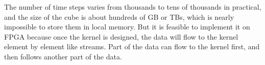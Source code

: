 The number of time steps 
varies from thousands to tens of thousands in practical, and the size of 
the cube is about hundreds of GB or TBs, which is nearly impossible to 
store them in local memory. But it is feasible to implement it on FPGA 
because once the kernel is designed, the data will flow to the kernel 
element by element like streams. Part of the data can flow to the kernel 
first, and then follows another part of the data.

